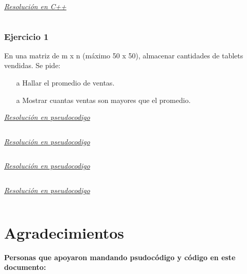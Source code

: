 \documentclass{article}
\begin{document}
\underline{\textit{Resolución en C++}}\\
\inputminted{cpp}{./cpp/Ejemplo.cpp}


\subsubsection*{Ejercicio 1}%
En una matriz de m x n (máximo 50 x 50), almacenar cantidades de tablets vendidas. Se pide:
\begin{itemize}
  \item[a] Hallar el promedio de ventas.
  \item[a] Mostrar cuantas ventas son mayores que el promedio.
\end{itemize}

\underline{\textit{Resolución en pseudocodigo}}\\
\inputminted{./pseudocode.py:PseudocodeLexer -x}{./pseudocodigo/Lab_001.algo}

\underline{\textit{Resolución en pseudocodigo}}\\
\inputminted{./pseudocode.py:PseudocodeLexer -x}{./pseudocodigo/Lab_002.algo}

\underline{\textit{Resolución en pseudocodigo}}\\
\inputminted{./pseudocode.py:PseudocodeLexer -x}{./pseudocodigo/Lab_003.algo}

\underline{\textit{Resolución en pseudocodigo}}\\
\inputminted{./pseudocode.py:PseudocodeLexer -x}{./pseudocodigo/Lab_004.algo}




























\section*{Agradecimientos}
\textbf{Personas que apoyaron mandando psudocódigo y código en este documento:}\\

\vspace{3cm} 
\end{document}
